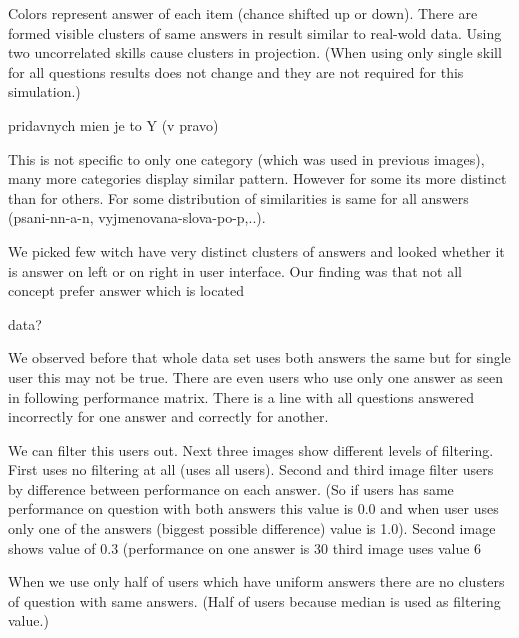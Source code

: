\documentclass[
  digital, %
  table,   %
  nolof,     %
  nolot,     %
  nocover
]{fithesis3}
\begin{document}
Colors represent answer of each item (chance shifted up or down). There
are formed visible clusters of same answers in result similar to
real-wold data. Using two uncorrelated skills cause clusters in
projection. (When using only single skill for all questions results does
not change and they are not required for this simulation.)

pridavnych mien je to Y (v pravo)

This is not specific to only one category (which was used in previous
images), many more categories display similar pattern. However for some
its more distinct than for others. For some distribution of similarities
is same for all answers (psani-nn-a-n, vyjmenovana-slova-po-p,..).

We picked few witch have very distinct clusters of answers and looked whether it is
answer on left or on right in user interface. Our finding was that not all concept prefer answer which is  located

data?


We observed before that whole data set uses both answers the same but
for single user this may not be true. There are even users who use only
one answer as seen in following performance matrix. There is a line with
all questions answered incorrectly for one answer and correctly for
another.


We can filter this users out. Next three images show different levels of
filtering. First uses no filtering at all (uses all users). Second and
third image filter users by difference between performance on each
answer. (So if users has same performance on question with both answers
this value is 0.0 and when user uses only one of the answers (biggest
possible difference) value is 1.0). Second image shows value of 0.3
(performance on one answer is 30%
third image uses value 6%


When we use only half of users which have uniform answers there are no
clusters of question with same answers. (Half of users because median is
used as filtering value.)
\end{document}
